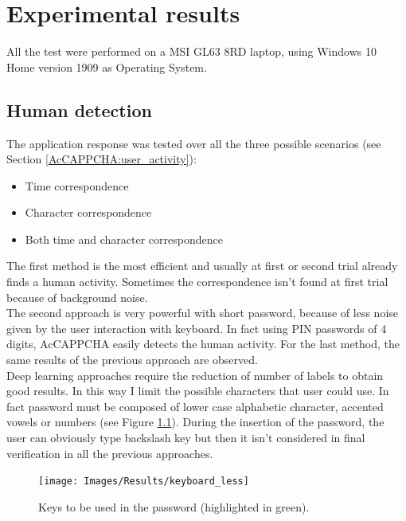 \chapter{Experimental results}
All the test were performed on a MSI GL63 8RD laptop, using Windows 10 Home version 1909 as Operating System.

\section{Human detection}
The application response was tested over all the three possible scenarios (see Section \ref{AcCAPPCHA:user_activity}): 
\begin{itemize}
\item{Time correspondence}
\item{Character correspondence}
\item{Both time and character correspondence}
\end{itemize}
The first method is the most efficient and usually at first or second trial already finds a human activity. Sometimes the correspondence isn't found at first trial because of background noise. \\
The second approach is very powerful with short password, because of less noise given by the user interaction with keyboard. In fact using PIN passwords of 4 digits, AcCAPPCHA easily detects the human activity. For the last method, the same results of the previous approach are observed.\\
Deep learning approaches require the reduction of number of labels to obtain good results. In this way I limit the possible characters that user could use. In fact password must be composed of lower case alphabetic character, accented vowels or numbers (see Figure \ref{Results:keyboard}). During the insertion of the password, the user can obviously type backslash key but then it isn't considered in final verification in all the previous approaches.\\
\begin{figure}[h]
     \centering
	 \texttt{[image: Images/Results/keyboard\_less]}
     \caption{\footnotesize{Keys to be used in the password (highlighted in green).}}\label{Results:keyboard}
\end{figure}

